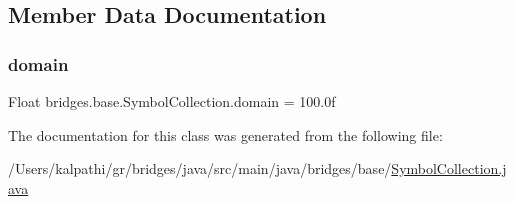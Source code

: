 \subsection{Member Data Documentation}
\mbox{\label{classbridges_1_1base_1_1_symbol_collection_a7624e96d2a4b5b6264791eb8dacbd350}} 
\subsubsection{\texorpdfstring{domain}{domain}}
{\footnotesize\ttfamily Float bridges.\+base.\+Symbol\+Collection.\+domain = 100.\+0f\hspace{0.3cm}{\ttfamily [protected]}}



The documentation for this class was generated from the following file\+:\begin{DoxyCompactItemize}
\item 
/\+Users/kalpathi/gr/bridges/java/src/main/java/bridges/base/\mbox{\hyperlink{_symbol_collection_8java}{Symbol\+Collection.\+java}}\end{DoxyCompactItemize}
